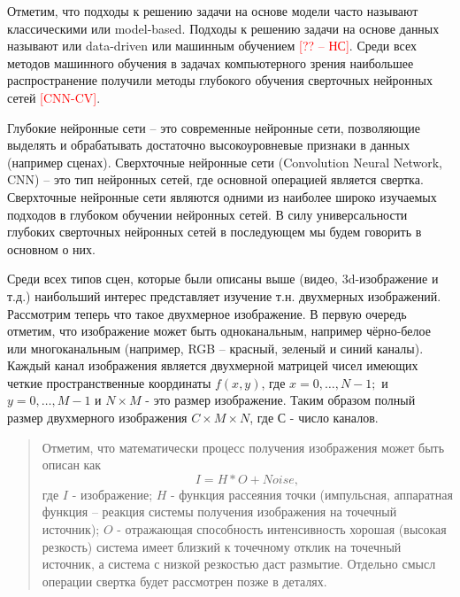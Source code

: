 \documentclass[12pt]{article}
\begin{document}
\begin{sloppypar}
Отметим, что подходы к решению задачи на основе модели часто называют классическими или model-based. Подходы к решению задачи на основе данных называют или data-driven или машинным обучением \textcolor{red}{[?? – НС]}.  Среди всех методов машинного обучения в задачах компьютерного зрения наибольшее распространение получили методы глубокого обучения сверточных нейронных сетей \textcolor{red}{[CNN-CV]}. 

Глубокие нейронные сети – это современные нейронные сети, позволяющие выделять и обрабатывать достаточно высокоуровневые признаки в данных (например сценах). Сверхточные нейронные сети (Convolution Neural Network, CNN) – это тип нейронных сетей, где основной операцией является свертка. Сверхточные нейронные сети являются одними из наиболее широко изучаемых подходов в глубоком обучении нейронных сетей. В силу универсальности глубоких сверточных нейронных сетей в последующем мы будем говорить в основном о них. 

Среди всех типов сцен, которые были описаны выше (видео, 3d-изображение и т.д.) наибольший интерес представляет изучение т.н. двухмерных изображений. Рассмотрим теперь что такое двухмерное изображение. В первую очередь отметим, что изображение может быть одноканальным, например чёрно-белое или многоканальным (например, RGB – красный, зеленый и синий каналы). Каждый канал изображения является двухмерной матрицей чисел имеющих четкие пространственные координаты $f(x,y)$, где $x=0,…,N-1;$ и $y=0,…,M-1$ и $N\times M$ - это размер изображение. Таким образом полный размер двухмерного изображения $C\times M\times N$, где $С$ - число каналов. 
\begin{quote}
	Отметим, что математически процесс получения изображения может быть описан как
	$$I = H\ast O + Noise,$$
	где $I$ - изображение; $H$ - функция рассеяния точки (импульсная, аппаратная функция – реакция системы получения изображения на точечный источник); $O$ - отражающая способность  интенсивность 
	хорошая (высокая резкость) система имеет близкий к точечному отклик на точечный источник, а система с низкой резкостью даст размытие.
	Отдельно смысл операции свертка будет рассмотрен позже в деталях.
\end{quote}


\end{sloppypar}
\end{document}
